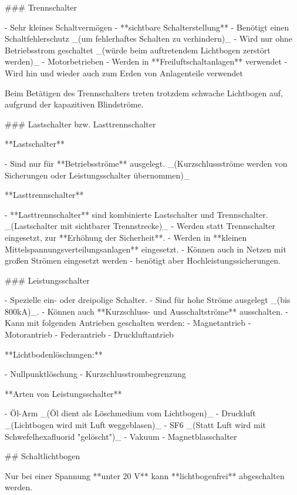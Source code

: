 \begin{markdown}
### Trennschalter

- Sehr kleines Schaltvermögen
- **sichtbare Schalterstellung**
- Benötigt einen Schaltfehlerschutz _(um fehlerhaftes Schalten zu verhindern)_
- Wird nur ohne Betriebsstrom geschaltet _(würde beim auftretendem Lichtbogen zerstört werden)_
- Motorbetrieben
- Werden in **Freiluftschaltanlagen** verwendet
- Wird hin und wieder auch zum Erden von Anlagenteile verwendet

Beim Betätigen des Trennschalters treten trotzdem schwache Lichtbogen auf, aufgrund der kapazitiven Blindströme.

### Lastschalter bzw. Lasttrennschalter

**Lastschalter**

- Sind nur für **Betriebsströme** ausgelegt. _(Kurzschlussströme werden von Sicherungen oder Leistungsschalter übernommen)_

**Lasttrennschalter**

- **Lasttrennschalter** sind kombinierte Lastschalter und Trennschalter. _(Lastschalter mit sichtbarer Trennstrecke)_
- Werden statt Trennschalter eingesetzt, zur **Erhöhung der Sicherheit**.
- Werden in **kleinen Mittelspannungsverteilungsanlagen** eingesetzt.
- Können auch in Netzen mit großen Strömen eingesetzt werden - benötigt aber Hochleistungssicherungen.

### Leistungsschalter

- Spezielle ein- oder dreipolige Schalter.
- Sind für hohe Ströme ausgelegt _(bis 800kA)_.
- Können auch **Kurzschluss- und Ausschaltströme** ausschalten.
- Kann mit folgenden Antrieben geschalten werden:
    - Magnetantrieb
    - Motorantrieb
    - Federantrieb
    - Druckluftantrieb

**Lichtbodenlöschungen:**

- Nullpunktlöschung
- Kurzschlusstrombegrenzung

**Arten von Leistungsschalter**

- Öl-Arm _(Öl dient als Löschmedium vom Lichtbogen)_
- Druckluft _(Lichtbogen wird mit Luft weggeblasen)_
- SF6 _(Statt Luft wird mit Schwefelhexafluorid "gelöscht")_
- Vakuum
- Magnetblasschalter

\newpage

## Schaltlichtbogen


Nur bei einer Spannung **unter 20 V** kann **lichtbogenfrei** abgeschalten werden.


\end{markdown}
